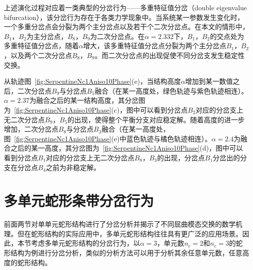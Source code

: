 上述演化过程对应着一类典型的分岔行为——多重特征值分岔（double eigenvalue bifurcation），该分岔行为存在于各类力学现象中\cite{bauer1975multiple,tavener1988buckling,keener1979secondary}。当系统某一参数发生变化时，一个多重分岔点会分裂为两个主分岔点以及若干个二次分岔点\cite{bauer1975multiple}。在本文的情形中，$B_1$，$B_2$为主分岔点，$B_8$，$B_9$为二次分岔点。在$\alpha=2.332$下，$B_1$，$B_2$的交点处为多重特征值分岔点，随着$\alpha$增大，该多重特征值分岔点分裂为两个主分岔点$B_1$，$B_2$，以及两个二次分岔点$B_8$，$B_9$。而二次分岔点的出现促使不同分岔支发生稳定性交换。

从轨迹图~\ref{fig:SerpentineNc1Aniso10Phase}(e)，当结构高度$\alpha$增加到某一数值之后，二次分岔点$B_9$与分岔点$B_5$融合（在某一高度处，绿色轨迹与紫色轨迹相连）。$\alpha=2.37$为融合之后的某一结构高度，其分岔图为~\ref{fig:SerpentineNc1Aniso10Phase}(c)，图中可以看到分岔点$B_2$对应的分岔支上无二次分岔点$B_9$，$B_5$的出现，使得整个平衡分支对应稳定解。随着高度的进一步增加，二次分岔点$B_8$与分岔点$B_3$融合（在某一高度处，图~\ref{fig:SerpentineNc1Aniso10Phase}(e)中蓝色轨迹与橘色轨迹相连）。$\alpha=2.4$为融合之后的某一高度，其分岔图为~\ref{fig:SerpentineNc1Aniso10Phase}(d)，图中可以看到分岔点$B_1$对应的分岔支上无二次分岔点$B_8$，$B_3$的出现，分岔点$B_1$分岔出的分支在分岔点$B_4$之前为非稳定解。
\section{多单元蛇形条带分岔行为}
前面两节对单单元蛇形结构进行了分岔分析并揭示了不同屈曲模态交换的数学机理。但在蛇形结构的实际应用中，多单元蛇形结构往往具有更广泛的应用场景。因此，本节考虑多单元蛇形结构的分岔行为，以$\alpha=3$，单元数$n_c=2$和$n_c=3$的蛇形结构为例进行分岔分析，类似的分析方法可以用于分析其余任意单元数，任意高度的蛇形结构。


